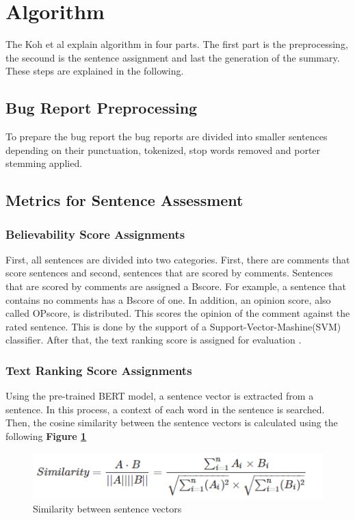 \documentclass[a4paper,10pt, bibliography=totocnumbered]{scrreprt}
\begin{document}
\section{Algorithm}
The Koh et al \cite{koh} explain algorithm in four parts. The first part is the preprocessing, the secound is the sentence assignment and last the generation of the summary. These steps are explained in the following.
\subsection{Bug Report Preprocessing}
To prepare the bug report the bug reports are divided into smaller sentences depending on their punctuation, tokenized, stop words removed and porter stemming applied. 
\subsection{Metrics for Sentence Assessment}
\subsubsection{Believability Score Assignments}
First, all sentences are divided into two categories. First, there are comments that score sentences and second, sentences that are scored by comments. Sentences that are scored by comments are assigned a Bscore. For example, a sentence that contains no comments has a Bscore of one. In addition, an opinion score, also called OPscore, is distributed. This scores the opinion of the comment against the rated sentence. This is done by the support of a Support-Vector-Mashine(SVM) classifier. After that, the text ranking score is assigned for evaluation \cite{liu}.
\subsubsection{Text Ranking Score Assignments}
Using the pre-trained BERT model, a sentence vector is extracted from a sentence. In this process, a context of each word in the sentence is searched. Then, the cosine similarity between the sentence vectors is calculated using the following \textbf{Figure \ref{fig:simi}}

\begin{figure}
\centering
\includegraphics[scale=0.65]{../images/Thema10_Similarity.PNG}
\caption{Similarity between sentence vectors}
\label{fig:simi}
\end{figure} 
\end{document}
